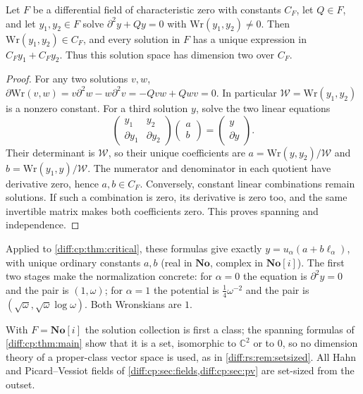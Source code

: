 \documentclass[11pt,letterpaper]{article}
\numberwithin{equation}{section}
\theoremstyle{definition}
\theoremstyle{remark}
\newcommand{\No}{\mathbf{No}}
\newcommand{\SC}{\mathbf{No}[i]}
\newcommand{\C}{\mathbb C}
\newcommand{\der}{\partial}
\begin{document}
\begin{lemma}
\label{diff:cp:lem:span}
Let $F$ be a differential field of characteristic zero with constants $C_{F}$,
let $Q\in F$, and let $y_{1},y_{2}\in F$ solve $\der^{2}y+Qy=0$ with
$\mathrm{Wr}(y_{1},y_{2})\neq0$. Then $\mathrm{Wr}(y_{1},y_{2})\in C_{F}$, and
every solution in $F$ has a unique expression in
$C_{F}y_{1}+C_{F}y_{2}$. Thus this solution space has dimension two
over $C_{F}$.
\end{lemma}
\begin{proof}
For any two solutions $v,w$,
$\der\mathrm{Wr}(v,w)=v\der^{2}w-w\der^{2}v=-Qvw+Qwv=0$.
In particular $\mathcal W=\mathrm{Wr}(y_{1},y_{2})$ is a nonzero constant.
For a third solution $y$, solve the two linear equations
\[
 \begin{pmatrix}y_{1}&y_{2}\\ \der y_{1}&\der y_{2}\end{pmatrix}
 \begin{pmatrix}a\\b\end{pmatrix}
 =\begin{pmatrix}y\\\der y\end{pmatrix}.
\]
Their determinant is $\mathcal W$, so their unique coefficients are
$a=\mathrm{Wr}(y,y_{2})/\mathcal W$ and $b=\mathrm{Wr}(y_{1},y)/\mathcal W$.
The numerator and denominator in each quotient have derivative
zero, hence $a,b\in C_{F}$. Conversely, constant linear
combinations remain solutions. If such a combination is zero,
its derivative is zero too, and the same invertible matrix makes
both coefficients zero. This proves spanning and independence.
\end{proof}

Applied to \cref{diff:cp:thm:critical}, these formulas give exactly
$y=u_{\alpha}(a+b\ell_{\alpha})$, with unique ordinary constants
$a,b$ (real in $\No$, complex in $\SC$). The first two stages make
the normalization concrete: for $\alpha=0$ the equation is
$\der^{2}y=0$ and the pair is $(1,\omega)$; for $\alpha=1$ the
potential is $\frac14\omega^{-2}$ and the pair is
$(\sqrt\omega,\sqrt\omega\log\omega)$. Both Wronskians are $1$.

With $F=\SC$ the solution collection is first a class; the spanning formulas
of \cref{diff:cp:thm:main} show that it is a set, isomorphic to $\C^{2}$ or to
$0$, so no dimension theory of a proper-class vector space is used, as in
\cref{diff:rs:rem:setsized}. All Hahn and Picard--Vessiot fields of
\cref{diff:cp:sec:fields,diff:cp:sec:pv} are set-sized from the outset.
\end{document}
